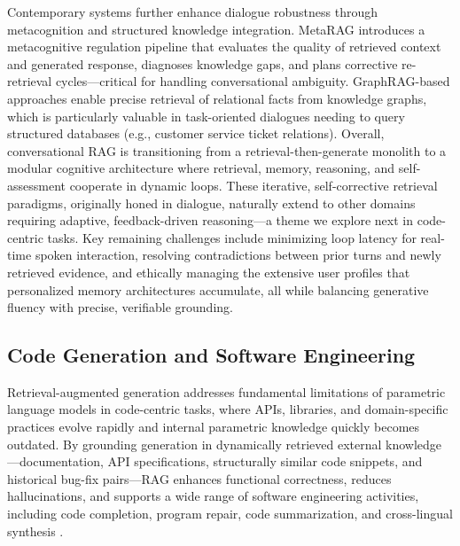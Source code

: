 \documentclass[11pt,a4paper]{article}
\begin{document}
Contemporary systems further enhance dialogue robustness through metacognition and structured knowledge integration. MetaRAG \cite{arxiv:2402.11626v1} introduces a metacognitive regulation pipeline that evaluates the quality of retrieved context and generated response, diagnoses knowledge gaps, and plans corrective re-retrieval cycles---critical for handling conversational ambiguity. GraphRAG-based approaches \cite{arxiv:2408.04948v1} enable precise retrieval of relational facts from knowledge graphs, which is particularly valuable in task-oriented dialogues needing to query structured databases (e.g., customer service ticket relations). Overall, conversational RAG is transitioning from a retrieval-then-generate monolith to a modular cognitive architecture where retrieval, memory, reasoning, and self-assessment cooperate in dynamic loops. These iterative, self-corrective retrieval paradigms, originally honed in dialogue, naturally extend to other domains requiring adaptive, feedback-driven reasoning---a theme we explore next in code-centric tasks. Key remaining challenges include minimizing loop latency for real-time spoken interaction, resolving contradictions between prior turns and newly retrieved evidence, and ethically managing the extensive user profiles that personalized memory architectures accumulate, all while balancing generative fluency with precise, verifiable grounding.


\subsection{Code Generation and Software Engineering}


Retrieval-augmented generation addresses fundamental limitations of parametric language models in code-centric tasks, where APIs, libraries, and domain-specific practices evolve rapidly and internal parametric knowledge quickly becomes outdated. By grounding generation in dynamically retrieved external knowledge---documentation, API specifications, structurally similar code snippets, and historical bug-fix pairs---RAG enhances functional correctness, reduces hallucinations, and supports a wide range of software engineering activities, including code completion, program repair, code summarization, and cross-lingual synthesis \cite{arxiv:2108.11601v2,arxiv:2402.12317v1}.
\end{document}
